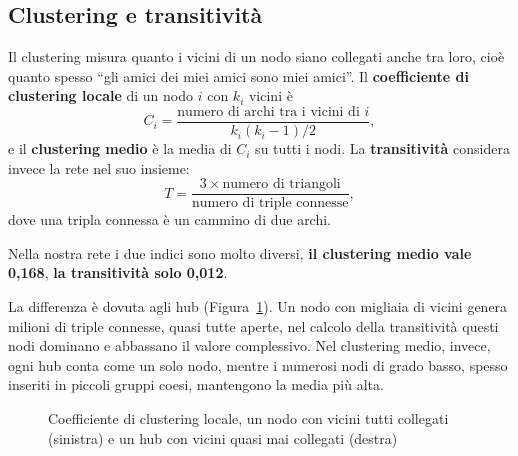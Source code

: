 \documentclass[11pt]{report}
\begin{document}
\subsection{Clustering e transitività}
Il clustering misura quanto i vicini di un nodo siano collegati anche tra loro, cioè quanto spesso
``gli amici dei miei amici sono miei amici''. Il \textbf{coefficiente di clustering locale} di un nodo $i$
con $k_i$ vicini è
\[
  C_i = \frac{\text{numero di archi tra i vicini di } i}{k_i (k_i - 1)/2},
\]
e il \textbf{clustering medio} è la media di $C_i$ su tutti i nodi. La \textbf{transitività} considera
invece la rete nel suo insieme:
\[
  T = \frac{3 \times \text{numero di triangoli}}{\text{numero di triple connesse}},
\]
dove una tripla connessa è un cammino di due archi.

Nella nostra rete i due indici sono molto diversi, \textbf{il clustering medio vale 0,168}, \textbf{la transitività solo
0,012}.

La differenza è dovuta agli hub (Figura~\ref{fig:clustering}). Un nodo con migliaia di vicini genera
milioni di triple connesse, quasi tutte aperte, nel calcolo della transitività questi nodi dominano e
abbassano il valore complessivo. Nel clustering medio, invece, ogni hub conta come un solo nodo, mentre i
numerosi nodi di grado basso, spesso inseriti in piccoli gruppi coesi, mantengono la media più alta.

\begin{figure}[H]
\centering
{}
\caption{Coefficiente di clustering locale, un nodo con vicini tutti collegati (sinistra) e un hub con vicini quasi mai collegati (destra)}
\label{fig:clustering}
\end{figure}
\end{document}
